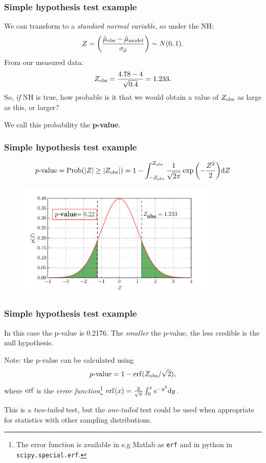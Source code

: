 \begin{frame}

\frametitle{Simple hypothesis test example}
\label{simplehypothesistestexample}

We can transform to a \emph{standard normal variable}, so under the NH:
\[
Z = \left( \frac{\hat{\mu}_{\rm obs}-\hat{\mu}_{\rm model}}{\sigma_{\hat{\mu}}}\right) \sim N(0,1).
\]
From our measured data:
\[
Z_{\rm obs} = \frac{4.78-4}{\sqrt{0.4}} = 1.233.
\]
So, \emph{if} NH is true, how probable is it that we would obtain a value of $Z_{\rm obs}$ as large as this, or larger?

We call this probability the \textbf{\color{red}p-value}. 

\end{frame}

\begin{frame}

\frametitle{Simple hypothesis test example}
\label{simplehypothesistestexample}

\[
p\text{-value} = \text{Prob}(|Z| \ge |Z_{\rm obs}|) = 1 - \int_{-Z_{\rm obs}}^{Z_{\rm obs}} \frac{1}{\sqrt{2\pi}}\exp{\left( -\frac{Z^2}{2}\right)} {\rm d}Z
\]

\begin{figure}[htbp]
\centering
\includegraphics[keepaspectratio,width=\textwidth,height=155pt]{figures/pvalue.pdf}
\label{pvalue}
\end{figure}

\end{frame}

\begin{frame}

\frametitle{Simple hypothesis test example}
\label{simplehypothesistestexample}

In this case the p-value is 0.2176. The \emph{smaller} the p-value, the less credible is the null hypothesis.

Note: the p-value can be calculated using
\[
p\text{-value} = 1 - {\rm erf}(Z_{\rm obs}/\sqrt{2}),
\]
where ${\rm erf}$ is the \emph{error function}\footnote{The error function is available in e.g Matlab as \texttt{erf} and in python in \texttt{scipy.special.erf}.}
${\rm erf}(x) = \frac{2}{\sqrt{\pi}}\int_{0}^{x} e^{-y^2} {\rm d}y$.

This is a \emph{two-tailed} test, but the \emph{one-tailed} test could be used when appropriate for statistics with other sampling distributions.

\end{frame}

